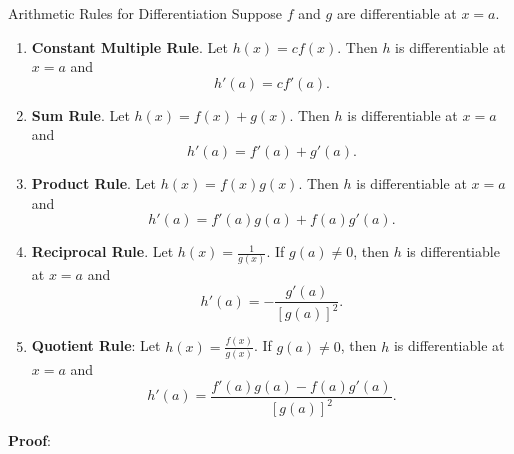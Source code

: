 \begin{Theorem}{Arithmetic Rules for Differentiation}{}
    Suppose $ f $ and $ g $ are differentiable at $ x=a $.
    \begin{enumerate}[(1)]
        \item \textbf{Constant Multiple Rule}. Let $ h(x)=cf(x) $. Then $ h $ is differentiable at $ x=a $ and
              \[ h'(a)=c f'(a). \]
        \item \textbf{Sum Rule}. Let $ h(x)=f(x)+g(x) $. Then $ h $ is differentiable at $ x=a $ and
              \[ h'(a)=f'(a)+g'(a). \]
        \item \textbf{Product Rule}. Let $ h(x)=f(x)g(x) $. Then $ h $ is differentiable at $ x=a $ and
              \[ h'(a)=f'(a)g(a)+f(a)g'(a). \]
        \item \textbf{Reciprocal Rule}. Let $ h(x)=\frac{1}{g(x)} $. If $ g(a)\ne 0 $, then $ h $ is differentiable at $ x=a $ and
              \[ h'(a)=-\frac{g'(a)}{[g(a)]^2}. \]
        \item \textbf{Quotient Rule}: Let $ h(x)=\frac{f(x)}{g(x)} $. If $ g(a)\ne 0 $, then $ h $ is differentiable at $ x=a $ and
              \[ h'(a)=\frac{f'(a)g(a)-f(a)g'(a)}{[g(a)]^2}. \]
    \end{enumerate}
    \tcblower{}
    \textbf{Proof}:
\end{Theorem}
